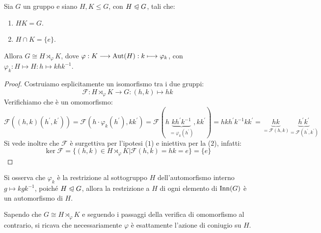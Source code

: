 \documentclass[11pt]{scrartcl}
\begin{document}
\begin{theorem}
    \label{t:1.78}
    Sia $G$ un gruppo e siano $H,K \leqslant G$, con $H \trianglelefteqslant G$, tali che:
        \begin{enumerate}[(1)]
            \item $HK = G$.
            \item $H \cap K = \{e\}$. 
        \end{enumerate}
    Allora $G \cong H \rtimes_{\varphi} K$, dove $\varphi : K \longrightarrow \operatorname{Aut}(H) : k \longmapsto \varphi_k$, con $\varphi_k : H \longmapsto H : h \longmapsto khk^{-1}$.
\end{theorem}

\begin{proof}
    Costruiamo esplicitamente un isomorfismo tra i due gruppi:
        \[ \mathcal{F} : H \rtimes_{\varphi} K \longrightarrow G : (h,k) \longmapsto hk
            \]
    Verifichiamo che è un omomorfismo:
        \[
            \mathcal{F}((h,k)(h^{\prime},k^{\prime})) = \mathcal{F}(h\cdot \varphi_k(h^{\prime}),kk^{\prime}) = \mathcal{F}(h\underbrace{kh^{\prime}k^{-1}}_{= \varphi_k(h^{\prime})},kk^{\prime})
            = hkh^{\prime}k^{-1}kk^{\prime} = \underbrace{hk}_{= \mathcal{F}(h,k)}\underbrace{h^{\prime}k^{\prime}}_{= \mathcal{F}(h^{\prime},k^{\prime})}
        \]
    Si vede inoltre che $\mathcal{F}$ è surgettiva per l'ipotesi ($1$) e iniettiva per la ($2$), infatti:
        \[ \ker\mathcal{F} = \{(h,k) \in  H \rtimes_{\varphi} K | \mathcal{F}(h,k) = hk = e\} = \{e\}
            \]
\end{proof}

\begin{remark}
    Si osserva che $\varphi_k$ è la restrizione al sottogruppo $H$ dell'automorfismo interno $g \longmapsto kgk^{-1}$, poiché
    $H \trianglelefteqslant G$, allora la restrizione a $H$ di ogni elemento di $\operatorname{Inn}(G)$ è un automorfismo di $H$.
\end{remark}

\begin{remark}
    Sapendo che $G \cong H \rtimes_{\varphi} K$ e seguendo i passaggi della verifica di omomorfismo al contrario, si ricava che necessariamente $\varphi$ è esattamente
    l'azione di coniugio su $H$.
\end{remark}

\pagebreak
\end{document}
